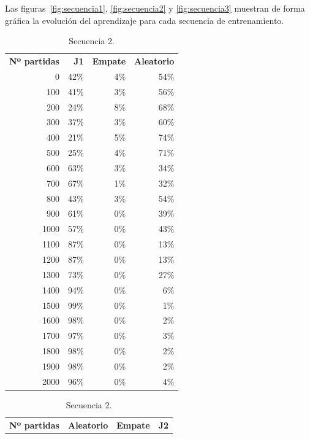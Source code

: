 Las figuras~\ref{fig:secuencia1}, \ref{fig:secuencia2} y \ref{fig:secuencia3} muestran de forma gráfica la evolución del aprendizaje para cada secuencia de entrenamiento.

\begin{table}[t]
	\centering
	\begin{minipage}[t]{0.4\linewidth}
		\centering
		\caption[Secuencia de entrenamiento 1]{Secuencia 1.}
		\label{tab:secuencia1}
				{\footnotesize
				\begin{tabular}{rrrr}
\hline
\textbf{Nº partidas} & \textbf{J1} & \textbf{Empate} & \textbf{Aleatorio} \\
0	& 42\% &	4\%	& 54\% \\
100	& 41\% &	3\%	& 56\% \\
200	& 24\% &	8\%	& 68\% \\
300	& 37\% &	3\%	& 60\% \\
400	& 21\% &	5\%	& 74\% \\
500	& 25\% &	4\%	& 71\% \\
600	& 63\% &	3\%	& 34\% \\
700	& 67\% &	1\%	& 32\% \\
800	& 43\% &	3\%	& 54\% \\
900	& 61\% &	0\%	& 39\% \\
1000 &	57\% &	0\%	& 43\% \\
1100 &	87\% &	0\%	& 13\% \\
1200 &	87\% &	0\%	& 13\% \\
1300 &	73\% &	0\%	& 27\% \\
1400 &	94\% &	0\%	& 6\% \\
1500 &	99\% &	0\%	& 1\% \\
1600 &	98\% &	0\%	& 2\% \\
1700 &	97\% &	0\%	& 3\% \\
1800 &	98\% &	0\%	& 2\% \\
1900 &	98\% &	0\%	& 2\% \\
2000 &	96\% &	0\%	& 4\% \\
\hline
\end{tabular}
}
	\end{minipage}
	\hspace{1cm}
	\begin{minipage}[t]{0.4\linewidth}
		\centering
		\caption[Secuencia de entrenamiento 2]{Secuencia 2.}
		\label{tab:secuencia2}
			{\footnotesize
				\begin{tabular}{rrrr}
\hline
\textbf{Nº partidas} & \textbf{Aleatorio} & \textbf{Empate} & \textbf{J2} \\

\end{tabular}}
\end{minipage}
\end{table}

